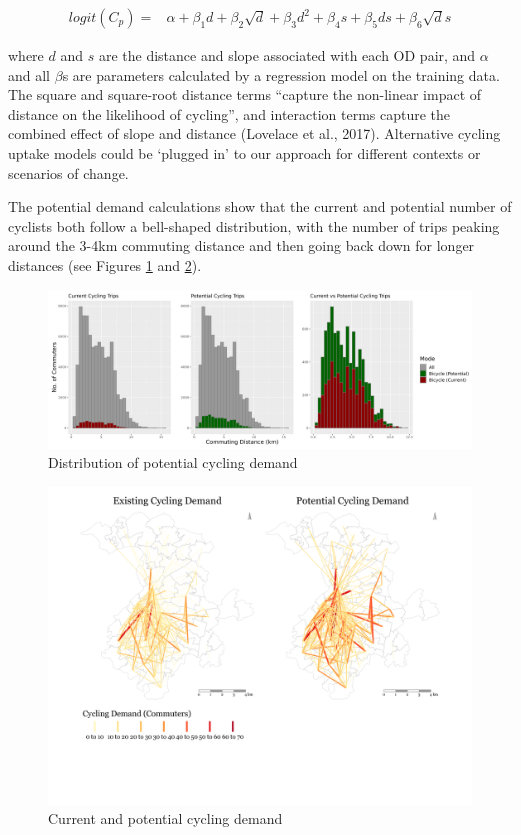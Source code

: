 \documentclass[
]{article}
\begin{document}
\begin{align}\label{eq:pcteqn}
     logit(C_{p}) = & \alpha + \beta_1 d + \beta_2 \sqrt{d} + \beta_3 d^2 + \beta_4 s + \beta_5 ds + \beta_6 \sqrt{d}s 
\end{align}

\noindent where \(d\) and \(s\) are the distance and slope associated with each OD pair, and \(\alpha\) and all \(\beta\)s are parameters calculated by a regression model on the training data.
The square and square-root distance terms ``capture the non-linear impact of distance on the likelihood of cycling'', and interaction terms capture the combined effect of slope and distance (Lovelace et al., 2017).
Alternative cycling uptake models could be `plugged in' to our approach for different contexts or scenarios of change.

The potential demand calculations show that the current and potential number of cyclists both follow a bell-shaped distribution, with the number of trips peaking around the 3-4km commuting distance and then going back down for longer distances (see Figures \ref{fig:potdemhistograms} and \ref{fig:desirefacetcycling}).

\begin{figure}

{\centering \includegraphics[width=0.9\linewidth]{data/Manchester/Plots/histogram_distance_cycling_potential_current_all} 

}

\caption{Distribution of potential cycling demand}\label{fig:potdemhistograms}
\end{figure}

\begin{figure}[H]

{\centering \includegraphics[width=0.65\linewidth]{data/Manchester/Plots/desire_facet_cycling} 

}

\caption{Current and potential cycling demand}\label{fig:desirefacetcycling}
\end{figure}
\end{document}
